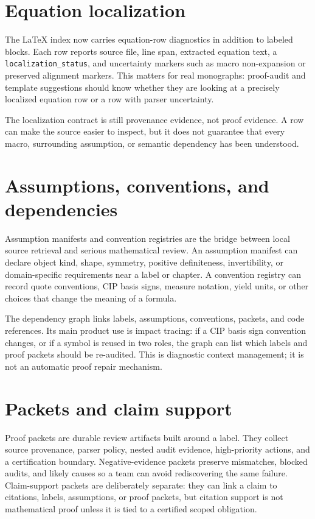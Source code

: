 \documentclass[12pt,a4paper,openany]{book}
\begin{document}
\section{Equation localization}

The LaTeX index now carries equation-row diagnostics in addition to labeled
blocks. Each row reports source file, line span, extracted equation text, a
\texttt{localization\_status}, and uncertainty markers such as macro
non-expansion or preserved alignment markers. This matters for real monographs:
proof-audit and template suggestions should know whether they are looking at a
precisely localized equation row or a row with parser uncertainty.

The localization contract is still provenance evidence, not proof evidence. A
row can make the source easier to inspect, but it does not guarantee that every
macro, surrounding assumption, or semantic dependency has been understood.

\section{Assumptions, conventions, and dependencies}

Assumption manifests and convention registries are the bridge between local
source retrieval and serious mathematical review. An assumption manifest can
declare object kind, shape, symmetry, positive definiteness, invertibility, or
domain-specific requirements near a label or chapter. A convention registry can
record quote conventions, CIP basis signs, measure notation, yield units, or
other choices that change the meaning of a formula.

The dependency graph links labels, assumptions, conventions, packets, and code
references. Its main product use is impact tracing: if a CIP basis sign
convention changes, or if a symbol is reused in two roles, the graph can list
which labels and proof packets should be re-audited. This is diagnostic context
management; it is not an automatic proof repair mechanism.

\section{Packets and claim support}

Proof packets are durable review artifacts built around a label. They collect
source provenance, parser policy, nested audit evidence, high-priority actions,
and a certification boundary. Negative-evidence packets preserve mismatches,
blocked audits, and likely causes so a team can avoid rediscovering the same
failure. Claim-support packets are deliberately separate: they can link a claim
to citations, labels, assumptions, or proof packets, but citation support is not
mathematical proof unless it is tied to a certified scoped obligation.
\end{document}
